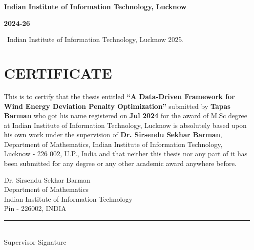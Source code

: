 \documentclass[12pt,a4paper]{report}
\begin{document}
\begin{titlepage}
    \vspace{0.5cm}

    {\large\bfseries Indian Institute of Information Technology, Lucknow \par}
    {\normalsize\bfseries 2024-26 \par}

    \vspace{0.5cm}

    {\small\textcopyright\ Indian Institute of Information Technology, Lucknow 2025. \par}

\end{titlepage}

\chapter*{CERTIFICATE}

\vspace{1cm}

This is to certify that the thesis entitled \textbf{``A Data-Driven Framework for Wind Energy Deviation Penalty Optimization''} submitted by \textbf{Tapas Barman} who got his name registered on \textbf{Jul 2024} for the award of M.Sc degree at Indian Institute of Information Technology, Lucknow is absolutely based upon his own work under the supervision of \textbf{Dr. Sirsendu Sekhar Barman}, Department of Mathematics, Indian Institute of Information Technology, Lucknow - 226 002, U.P., India and that neither this thesis nor any part of it has been submitted for any degree or any other academic award anywhere before.

\vspace{4cm}

\begin{minipage}[t]{0.48\textwidth}
    Dr. Sirsendu Sekhar Barman\\
    Department of Mathematics\\
    Indian Institute of Information Technology\\
    Pin - 226002, INDIA
\end{minipage}
\hfill
\begin{minipage}[t]{0.48\textwidth}
    \raggedleft
    \rule{6cm}{0.4pt}\\
    Supervisor Signature
\end{minipage}
\end{document}
